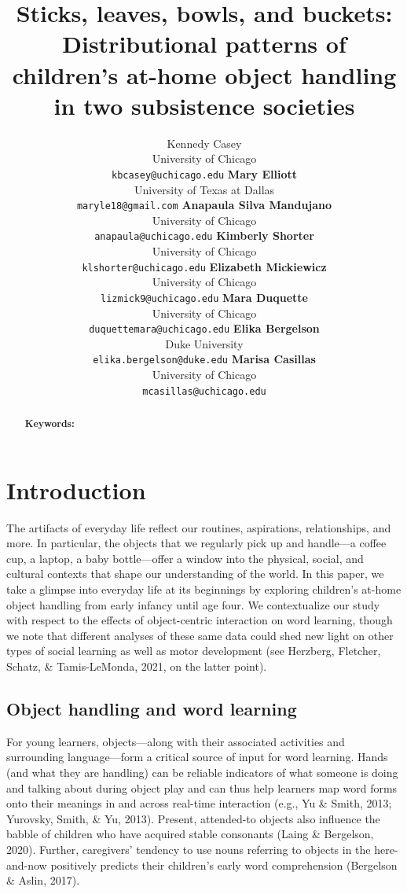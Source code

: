 \documentclass[10pt, letterpaper]{article}
\title{Sticks, leaves, bowls, and buckets: Distributional patterns of
children's at-home object handling in two subsistence societies}
\author{Kennedy Casey \\
        University of Chicago \\
        \texttt{\small{kbcasey@uchicago.edu}}
\And \textbf{Mary Elliott} \\
             University of Texas at Dallas \\
             \texttt{\small{maryle18@gmail.com}}
\And \textbf{Anapaula Silva Mandujano} \\
             University of Chicago \\
             \texttt{\small{anapaula@uchicago.edu}}   
\And \textbf{Kimberly Shorter} \\
             University of Chicago \\
             \texttt{\small{klshorter@uchicago.edu}}
\AND \textbf{Elizabeth Mickiewicz} \\
             University of Chicago \\
             \texttt{\small{lizmick9@uchicago.edu}}         
\And \textbf{Mara Duquette} \\
             University of Chicago \\
             \texttt{\small{duquettemara@uchicago.edu}}
\And \textbf{Elika Bergelson} \\
             Duke University \\
             \texttt{\small{elika.bergelson@duke.edu}}
\And \textbf{Marisa Casillas} \\
             University of Chicago \\
             \texttt{\small{mcasillas@uchicago.edu}}}
\begin{document}
\maketitle

\begin{abstract}


\textbf{Keywords:}

\end{abstract}

\hypertarget{introduction}{%
\section{Introduction}\label{introduction}}

The artifacts of everyday life reflect our routines, aspirations,
relationships, and more. In particular, the objects that we regularly
pick up and handle---a coffee cup, a laptop, a baby bottle---offer a
window into the physical, social, and cultural contexts that shape our
understanding of the world. In this paper, we take a glimpse into
everyday life at its beginnings by exploring children's at-home object
handling from early infancy until age four. We contextualize our study
with respect to the effects of object-centric interaction on word
learning, though we note that different analyses of these same data
could shed new light on other types of social learning as well as motor
development (see Herzberg, Fletcher, Schatz, \& Tamis-LeMonda, 2021, on
the latter point).

\hypertarget{object-handling-and-word-learning}{%
\subsection{Object handling and word
learning}\label{object-handling-and-word-learning}}

For young learners, objects---along with their associated activities and
surrounding language---form a critical source of input for word
learning. Hands (and what they are handling) can be reliable indicators
of what someone is doing and talking about during object play and can
thus help learners map word forms onto their meanings in and across
real-time interaction (e.g., Yu \& Smith, 2013; Yurovsky, Smith, \& Yu,
2013). Present, attended-to objects also influence the babble of
children who have acquired stable consonants (Laing \& Bergelson, 2020).
Further, caregivers' tendency to use nouns referring to objects in the
here-and-now positively predicts their children's early word
comprehension (Bergelson \& Aslin, 2017).
\end{document}
